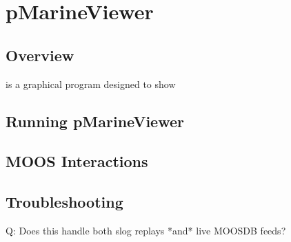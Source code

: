 \chapter{pMarineViewer}
\section{Overview}
\pmv is a graphical program designed to show 
\section{Running pMarineViewer}
\section{MOOS Interactions}
\section{Troubleshooting}

Q:  Does this handle both slog replays *and* live MOOSDB feeds?